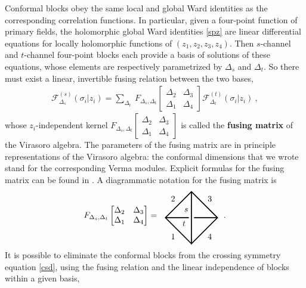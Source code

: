 \documentclass[12pt, a4paper, notitlepage, twoside]{report}
\numberwithin{equation}{section}
\theoremstyle{break}
\begin{document}
Conformal blocks obey the same local and global Ward identities as the corresponding correlation functions.
In particular, given a four-point function of primary fields, the holomorphic global Ward identities \eqref{spz} are linear differential equations for locally holomorphic functions of $(z_1,z_2,z_3,z_4)$.
Then
$s$-channel and $t$-channel four-point blocks each provide a basis of solutions of these equations, whose elements are respectively parametrized by $\Delta_s$ and $\Delta_t$.
So there must exist a linear, invertible fusing relation between the two bases, 
\begin{align}
 \mathcal{F}^{(s)}_{\Delta_s}(\sigma_i|z_i) = \sum_{\Delta_t}\ F_{\Delta_s,\Delta_t}\begin{bmatrix} \Delta_2 & \Delta_3 \\ \Delta_1 & \Delta_4 \end{bmatrix} \mathcal{F}^{(t)}_{\Delta_t}(\sigma_i|z_i)\ ,
\end{align}
whose $z_i$-independent kernel $F_{\Delta_s,\Delta_t}\begin{bmatrix} \Delta_2 & \Delta_3 \\ \Delta_1 & \Delta_4 \end{bmatrix}$ is called the \textbf{\boldmath fusing matrix} of the Virasoro algebra.
The parameters of the fusing matrix are in principle representations of the Virasoro algebra: the conformal dimensions that we wrote stand for the corresponding Verma modules. Explicit formulas for the fusing matrix can be found in \cite{tv12}.
A diagrammatic notation for the fusing matrix is 
\begin{align}
 F_{\Delta_s,\Delta_t}\begin{bmatrix} \Delta_2 & \Delta_3 \\ \Delta_1 & \Delta_4 \end{bmatrix} = \ \ 
\begin{tikzpicture}[baseline=(current  bounding  box.center), very thick, scale = .55]
\draw (0, -2) -- node [below left] {$1$} (-2, 0) -- node [above left] {$2$} (0, 2) -- node [above right] {$3$} (2, 0) -- node [below right] {$4$} (0, -2) -- (0, 2);
\draw (-2, 0) -- (-.2, 0) node [below left] {$t$}; \draw (.2, 0) -- (2, 0);
\node [above left] at (0, .2) {$s$};
\end{tikzpicture}
\ \ .
\end{align}
It is possible to eliminate the conformal blocks from the crossing symmetry equation \eqref{csd}, using the fusing relation and the linear independence of blocks within a given basis,
\end{document}
